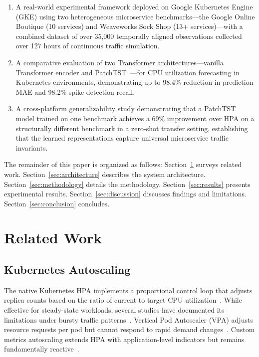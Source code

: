 \documentclass[conference]{IEEEtran}
\begin{document}
\begin{enumerate}
    \item A real-world experimental framework deployed on Google Kubernetes Engine (GKE) using two heterogeneous microservice benchmarks---the Google Online Boutique (10 services) and Weaveworks Sock Shop (13+ services)---with a combined dataset of over 35,000 temporally aligned observations collected over 127 hours of continuous traffic simulation.
    \item A comparative evaluation of two Transformer architectures---vanilla Transformer encoder and PatchTST~\cite{nie2023patchtst}---for CPU utilization forecasting in Kubernetes environments, demonstrating up to 98.4\% reduction in prediction MAE and 98.2\% spike detection recall.
    \item A cross-platform generalizability study demonstrating that a PatchTST model trained on one benchmark achieves a 69\% improvement over HPA on a structurally different benchmark in a zero-shot transfer setting, establishing that the learned representations capture universal microservice traffic invariants.
\end{enumerate}

The remainder of this paper is organized as follows: Section~\ref{sec:related} surveys related work. Section~\ref{sec:architecture} describes the system architecture. Section~\ref{sec:methodology} details the methodology. Section~\ref{sec:results} presents experimental results. Section~\ref{sec:discussion} discusses findings and limitations. Section~\ref{sec:conclusion} concludes.

\section{Related Work}\label{sec:related}

\subsection{Kubernetes Autoscaling}
The native Kubernetes HPA implements a proportional control loop that adjusts replica counts based on the ratio of current to target CPU utilization~\cite{k8s_hpa}. While effective for steady-state workloads, several studies have documented its limitations under bursty traffic patterns~\cite{nguyen2022survey, lorido2014review}. Vertical Pod Autoscaler (VPA) adjusts resource requests per pod but cannot respond to rapid demand changes~\cite{rzadca2020autopilot}. Custom metrics autoscaling extends HPA with application-level indicators but remains fundamentally reactive~\cite{baarzi2021showar}.
\end{document}
